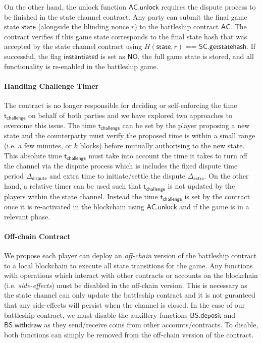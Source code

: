 \documentclass{llncs}
\newcommand{\instantiated}{\mathsf{instantiated}}
\newcommand{\instantiatedno}{\mathsf{NO}}
\newcommand{\stateinfo}{\mathsf{state}}
\newcommand{\statechannelgetcommitment}{\mathsf{SC}.\mathsf{getstatehash}}
\newcommand{\battleshipdeposit}{\mathsf{BS.deposit}}
\newcommand{\battleshipwithdraw}{\mathsf{BS.withdraw}}
\newcommand{\appcontract}{\mathsf{AC}}
\newcommand{\appunlock}{\mathsf{AC.unlock}}
\newcommand{\timechallenge}{\mathsf{t}_{\mathsf{challenge}}}
\newcommand{\timerextra}{\mathsf{\Delta}_{\mathsf{extra}}}
\newcommand{\timerdispute}{\mathsf{\Delta}_{\mathsf{dispute}}}
\begin{document}
On the other hand, the unlock function $\appunlock$ requires the dispute process to be finished in the state channel contract. 
Any party can submit the final game state $\stateinfo$ (alongside the blinding nonce $r$) to the battleship contract $\appcontract$. 
The contract verifies if this game state corresponds to the final state hash that was accepted by the state channel contract using $H(\stateinfo,r)$ == $\statechannelgetcommitment$.
If successful, the flag $\instantiated$ is set as $\instantiatedno$, the full game state is stored, and all functionality is re-enabled in the battleship game. 

\paragraph{Handling Challenge Timer}\label{sec:timers}
The contract is no longer responsible for deciding or self-enforcing the time $\timechallenge$ on behalf of both parties and we have explored two approaches to overcome this issue. 
The time $\timechallenge$ can be set by the player proposing a new state and the counterparty must verify the proposed time is within a small range (i.e. a few minutes, or $k$ blocks) before mutually authorising to the new state.
This absolute time $\timechallenge$ must take into account the time it takes to turn off the channel via the dispute process which is includes the fixed dispute time period $\timerdispute$ and extra time to initiate/settle the dispute $\timerextra$. 
On the other hand, a relative timer can be used such that $\timechallenge$ is not updated by the players within the state channel.
Instead the time $\timechallenge$ is set by the contract once it is re-activated in the blockchain using $\appunlock$ and if the game is in a relevant phase. 

\paragraph{Off-chain Contract} 
We propose each player can deploy an \textit{off-chain} version of the battleship contract to a local blockchain to execute all state transitions for the game. 
Any functions with operations which interact with other contracts or accounts on the blockchain (i.e. \textit{side-effects}) must be disabled in the off-chain version. 
This is necessary as the state channel can only update the battleship contract and it is not guranteed that any side-effects will persist when the channel is closed. 
In the case of our battleship contract, we must disable the auxillery functions $\battleshipdeposit$ and $\battleshipwithdraw$ as they send/receive coins from other accounts/contracts. 
To disable, both functions can simply be removed from the off-chain version of the contract. 
\end{document}

